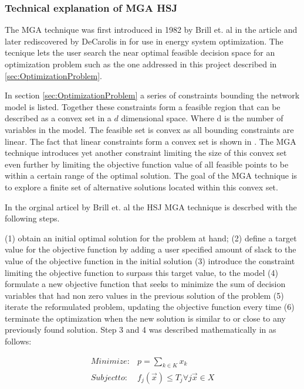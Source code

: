 \subsubsection{Technical explanation of MGA HSJ}

The MGA technique was first introduced in 1982 by Brill et. al in the article \cite{Brill_MGA_1982} and later rediscovered by DeCarolis in \cite{DeCarolis_MGA} for use in energy system optimization. The tecnique lets the user search the near optimal feasible decision space for an optimization problem such as the one addressed in this project described in \ref{sec:OptimizationProblem}. 

In section \ref{sec:OptimizationProblem} a series of constraints bounding the network model is listed. Together these constraints form a feasible region that can be described as a convex set in a $d$ dimensional space. Where d is the number of variables in the model. The feasible set is convex as all bounding constraints are linear. The fact that linear constraints form a convex set is shown in \cite{ConvexOpimization}. The MGA technique introduces yet another constraint limiting the size of this convex set even further by limiting the objective function value of all feasible points to be within a certain range of the optimal solution. The goal of the MGA technique is to explore a finite set of alternative solutions located within this convex set. 

In the orginal articel by Brill et. al \cite{Brill_MGA_1982} the HSJ MGA technique is descrbed with the following steps. 

(1) obtain an initial optimal solution for the problem at hand; (2) define a target value for the objective function by adding a user specified amount of slack to the value of the objective function in the initial solution (3) introduce the constraint limiting the objective function to surpass this target value, to the model (4) formulate a new objective function that seeks to minimize the sum of decision variables that had non zero values in the previous solution of the problem (5) iterate the reformulated problem, updating the objective function every time (6) terminate the optimization when the new solution is similar to or close to any previously found solution. Step 3 and 4 was described mathematically in \cite{Brill_MGA_1982} as follows:

\begin{equation}
\begin{split}
Minimize :&  p = \sum_{k \in K} x_k \\
Subject to :&  f_j(\vec{x}) \leq T_j \forall j  \vec{x}\in X
\end{split}
\end{equation}

